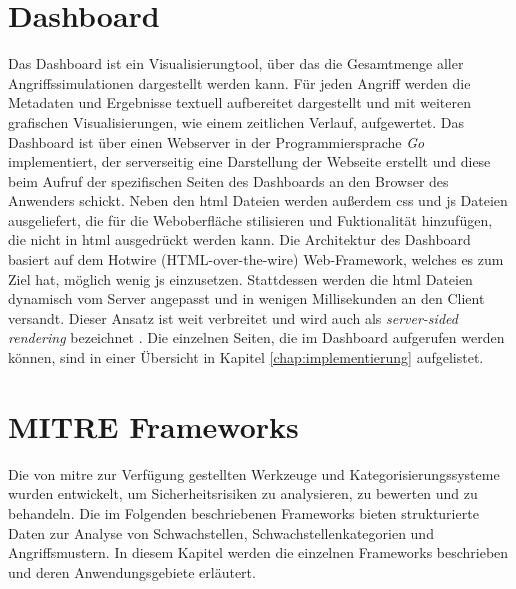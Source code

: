 \section{Dashboard}
\label{sec:tech-dashboard}
Das Dashboard ist ein Visualisierungtool, über das die Gesamtmenge aller Angriffssimulationen dargestellt werden kann. Für jeden Angriff werden die Metadaten und Ergebnisse textuell aufbereitet dargestellt und mit weiteren grafischen Visualisierungen, wie einem zeitlichen Verlauf, aufgewertet.
Das Dashboard ist über einen Webserver in der Programmiersprache \textit{Go} implementiert, der serverseitig eine Darstellung der Webseite erstellt und diese beim Aufruf der spezifischen Seiten des Dashboards an den Browser des Anwenders schickt. Neben den \gls{html} Dateien werden außerdem \gls{css} und \gls{js} Dateien ausgeliefert, die für die Weboberfläche stilisieren und Fuktionalität hinzufügen, die nicht in \gls{html} ausgedrückt werden kann. Die Architektur des Dashboard basiert auf dem Hotwire (HTML-over-the-wire) Web-Framework, welches es zum Ziel hat, möglich wenig \gls{js} einzusetzen. Stattdessen werden die \gls{html} Dateien dynamisch vom Server angepasst und in wenigen Millisekunden an den Client versandt. Dieser Ansatz ist weit verbreitet und wird auch als \textit{server-sided rendering} bezeichnet \autocite{HTMLWireHotwire}. Die einzelnen Seiten, die im Dashboard aufgerufen werden können, sind in einer Übersicht in Kapitel \ref{chap:implementierung} aufgelistet.

\label{bg:mitre-frameworks}
\section{MITRE Frameworks}
Die von \gls{mitre} zur Verfügung gestellten Werkzeuge und Kategorisierungssysteme wurden entwickelt, um Sicherheitsrisiken zu analysieren, zu bewerten und zu behandeln. Die im Folgenden beschriebenen Frameworks bieten strukturierte Daten zur Analyse von Schwachstellen, Schwachstellenkategorien und Angriffsmustern. In diesem Kapitel werden die einzelnen Frameworks beschrieben und deren Anwendungsgebiete erläutert.

